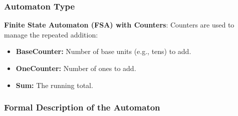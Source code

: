 \documentclass[11pt]{article}
\begin{document}
\subsubsection*{Automaton Type}
\textbf{Finite State Automaton (FSA) with Counters}:  
Counters are used to manage the repeated addition:
\begin{itemize}
    \item \textbf{BaseCounter:} Number of base units (e.g., tens) to add.
    \item \textbf{OneCounter:} Number of ones to add.
    \item \textbf{Sum:} The running total.
\end{itemize}

\subsubsection*{Formal Description of the Automaton}
\end{document}

